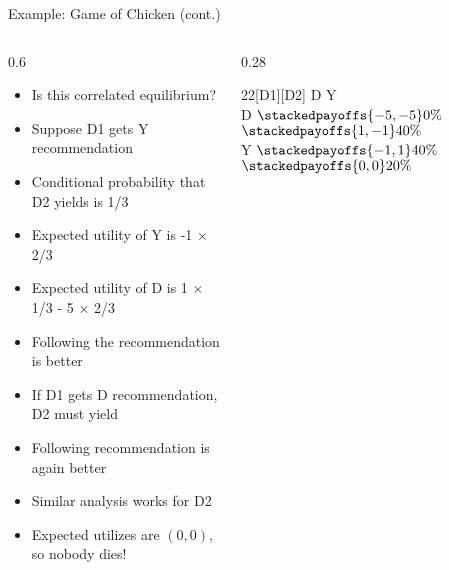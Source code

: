 \documentclass[11pt,aspectratio=169,handout]{beamer}
\begin{document}
  \begin{frame}{Example: Game of Chicken (cont.)}
   \begin{columns}
    \begin{column}{0.6\textwidth}
      \vspace{-1em}
      \begin{itemize}[<+->]
       \item Is this correlated equilibrium?
       \item Suppose D1 gets Y recommendation 
       \item Conditional probability that D2 yields is 1/3
       \item Expected utility of Y is -1 $\times$ 2/3
       \item Expected utility of D is 1 $\times$ 1/3 - 5 $\times$ 2/3
       \item Following the recommendation is better
       \item If D1 gets D recommendation, D2 must yield
       \item Following recommendation is again better
       \item Similar analysis works for D2
       \item Expected utilizes are $(0,0)$, so nobody dies!
      \end{itemize}
    \end{column}
    \begin{column}{0.28\textwidth}
     \begin{center}
      \renewcommand{\gamestretch}{2.5}
      \vspace{-9.2em}
      \hspace{-3.2em}
      \begin{game}{2}{2}[D1][D2]
            \> D									\> Y	     						\\
        D   \> $\stackedpayoffs{-5, -5}{0\%}$		\> $\stackedpayoffs{1, -1}{40\%}$	\\
        Y   \> $\stackedpayoffs{-1,  1}{40\%}$	\> $\stackedpayoffs{0,  0}{20\%}$
      \end{game}
     \end{center}
    \end{column}
   \end{columns}
  \end{frame}
\end{document}
